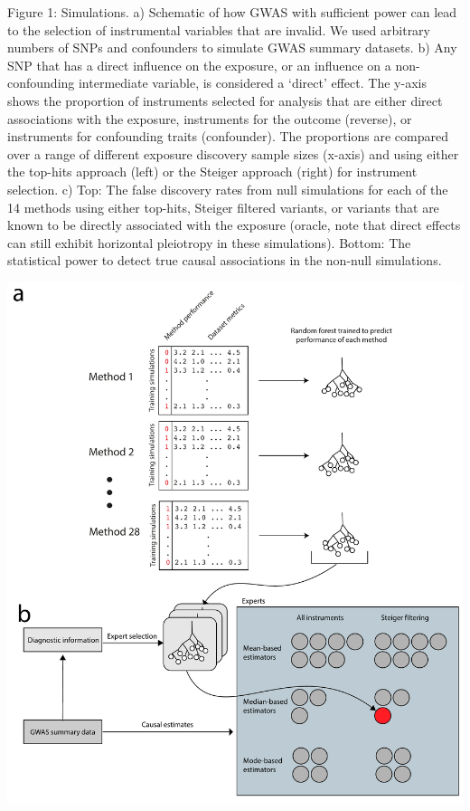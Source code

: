 \documentclass[]{article}
\begin{document}
Figure 1: Simulations. a) Schematic of how GWAS with sufficient power
can lead to the selection of instrumental variables that are invalid. We
used arbitrary numbers of SNPs and confounders to simulate GWAS summary
datasets. b) Any SNP that has a direct influence on the exposure, or an
influence on a non-confounding intermediate variable, is considered a
`direct' effect. The y-axis shows the proportion of instruments selected
for analysis that are either direct associations with the exposure,
instruments for the outcome (reverse), or instruments for confounding
traits (confounder). The proportions are compared over a range of
different exposure discovery sample sizes (x-axis) and using either the
top-hits approach (left) or the Steiger approach (right) for instrument
selection. c) Top: The false discovery rates from null simulations for
each of the 14 methods using either top-hits, Steiger filtered variants,
or variants that are known to be directly associated with the exposure
(oracle, note that direct effects can still exhibit horizontal
pleiotropy in these simulations). Bottom: The statistical power to
detect true causal associations in the non-null simulations.

\newpage

\includegraphics{images/fig2.pdf}
\end{document}
